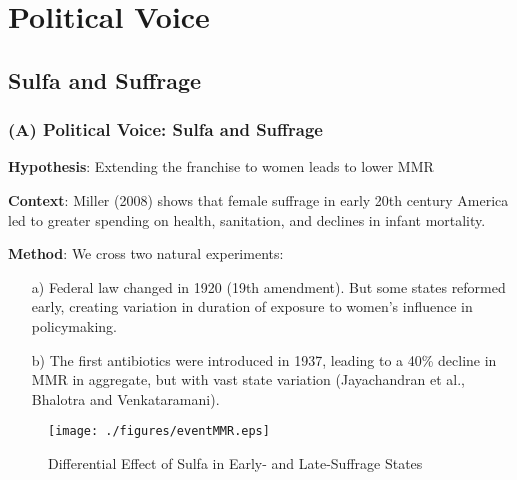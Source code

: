 \documentclass[10pt,letterpaper,subeqn]{beamer}
\begin{document}
\section{Political Voice}
\subsection{Sulfa and Suffrage}
\begin{frame}[label=USAHistory]
\frametitle{(A) Political Voice: Sulfa and Suffrage}
\textbf{Hypothesis}: Extending the franchise to women leads to lower MMR \\
\vspace{3mm}

\textbf{Context}: Miller (2008) shows that female suffrage in early 20th century America led to greater spending on health, sanitation, and declines in infant mortality. \\
\vspace{3mm}

\textbf{Method}: We cross two natural experiments:
\begin{enumerate}
\item[a)] Federal law changed in 1920 (19th amendment). But some states reformed early, creating variation in duration of exposure to women's influence in policymaking.

\item[b)] The first antibiotics were introduced in 1937, leading to a 40\% decline in MMR in aggregate, but with vast state variation (Jayachandran et al., Bhalotra and Venkataramani).
\end{enumerate}
\end{frame}


\begin{frame}[label=MMREvent,plain]
\begin{figure}
\caption{Differential Effect of Sulfa in Early- and Late-Suffrage States}
\texttt{[image: ./figures/eventMMR.eps]}
\end{figure}
\end{frame}
\end{document}
